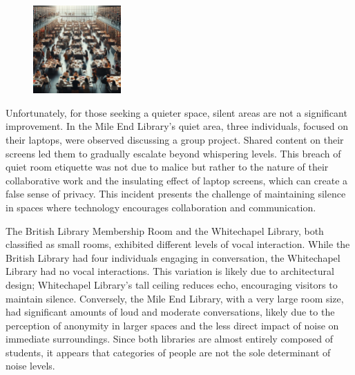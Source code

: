 \documentclass{novel}
\begin{document}
\begin{figure} 
\vspace{-\intextsep}
    \includegraphics[width=0.3\textwidth]{resources/mileEnd.jpg}
\end{figure}

Unfortunately, for those seeking a quieter space, silent areas are not a significant improvement. In the Mile End Library's quiet area, three individuals, focused on their laptops, were observed discussing a group project. Shared content on their screens led them to gradually escalate beyond whispering levels. This breach of quiet room etiquette was not due to malice but rather to the nature of their collaborative work and the insulating effect of laptop screens, which can create a false sense of privacy. This incident presents the challenge of maintaining silence in spaces where technology encourages collaboration and communication.

The British Library Membership Room and the Whitechapel Library, both classified as small rooms, exhibited different levels of vocal interaction. While the British Library had four individuals engaging in conversation, the Whitechapel Library had no vocal interactions. This variation is likely due to architectural design; Whitechapel Library's tall ceiling reduces echo, encouraging visitors to maintain silence. Conversely, the Mile End Library, with a very large room size, had significant amounts of loud and moderate conversations, likely due to the perception of anonymity in larger spaces and the less direct impact of noise on immediate surroundings. Since both libraries are almost entirely composed of students, it appears that categories of people are not the sole determinant of noise levels.
\end{document}
